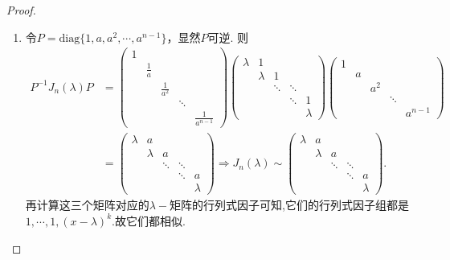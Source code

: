 \documentclass[../../main.tex]{subfiles}%
\begin{document}
\begin{proof}
\begin{enumerate}[(1)]
\item 令$P = \mathrm{diag}\{1, a, a^2, \cdots, a^{n-1}\}$，显然$P$可逆. 则
\begin{align*}
P^{-1}J_n(\lambda)P &= \begin{pmatrix}
1 & & & & \\
& \frac{1}{a} & & & \\
& & \frac{1}{a^2} & & \\
& & & \ddots & \\
& & & & \frac{1}{a^{n-1}}
\end{pmatrix} \begin{pmatrix}
\lambda & 1 & & & \\
& \lambda & 1 & & \\
& & \ddots & \ddots & \\
& & & \ddots & 1 \\
& & & & \lambda
\end{pmatrix} \begin{pmatrix}
1 & & & & \\
& a & & & \\
& & a^2 & & \\
& & & \ddots & \\
& & & & a^{n-1}
\end{pmatrix} \\
&= \begin{pmatrix}
\lambda & a & & & \\
& \lambda & a & & \\
& & \ddots & \ddots & \\
& & & \ddots & a \\
& & & & \lambda
\end{pmatrix} \Longrightarrow J_n(\lambda) \sim \begin{pmatrix}
\lambda & a & & & \\
& \lambda & a & & \\
& & \ddots & \ddots & \\
& & & \ddots & a \\
& & & & \lambda
\end{pmatrix}.
\end{align*}
再计算这三个矩阵对应的$\lambda-$矩阵的行列式因子可知,它们的行列式因子组都是$1,\cdots,1,(x-\lambda)^k$.故它们都相似.

\end{enumerate}
\end{proof}
\end{document}
